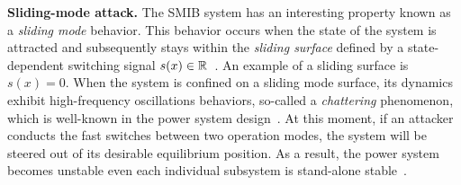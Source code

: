 \vspace{0.5em}
\noindent
{\bf Sliding-mode attack.} The SMIB system has an interesting property known as a \emph{sliding mode} behavior. This behavior occurs when the state of the system is attracted and subsequently stays within the \emph{sliding surface} defined by a state-dependent switching signal $s(x)\in\mathbb{R}$~\cite{decarlo1988variable, liu2014coordinated}. An example of a sliding surface is $s(x) = 0$. When the system is confined on a sliding mode surface, its dynamics exhibit high-frequency oscillations behaviors, so-called a \emph{chattering} phenomenon, which is well-known in the power system design~\cite{sabanovic2004variable}. At this moment, if an attacker conducts the fast switches between two operation modes, the system will be steered out of its desirable equilibrium position. As a result, the power system becomes unstable even each individual subsystem is stand-alone stable~\cite{liu2014coordinated}. 
%
%
%

